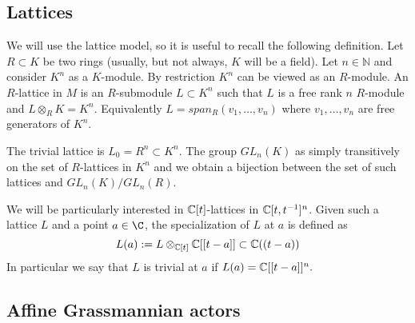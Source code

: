 \documentclass{article}
\begin{document}

\subsection{Lattices}
We will use the lattice model, so it is useful to recall the following definition.  Let $ R \subset K$ be two rings (usually, but not always, $K $ will be a field).  Let $ n \in \mathbb N$ and consider $ K^n $ as a $K$-module.   By restriction $ K^n$ can be viewed as an $R$-module.  An $R$-lattice in $ M$ is an $R$-submodule $ L \subset K^n$ such that $ L $ is a free rank $ n $ $R$-module and $ L \otimes_R K = K^n $.  Equivalently $ L = span_R(v_1, \dots, v_n)$ where $ v_1, \dots, v_n$ are free generators of $K^n$.  

The trivial lattice is $L_0 = R^n \subset K^n $.  The group $GL_n(K) $ as simply transitively on the set of $ R$-lattices in $K^n$ and we obtain a bijection between the set of such lattices and $ GL_n(K)/GL_n(R)$.

We will be particularly interested in $\mathbb C[t]$-lattices in $ \mathbb C[t,t^{-1}]^n$.  Given such a lattice $ L $ and a point $ a \in \C$, the specialization of $ L $ at $ a $ is defined as
$$
L(a) := L \otimes_{\mathbb C[t]} \mathbb C[[t-a]] \subset \mathbb C((t-a))
$$
In particular we say that $ L $ is trivial at $ a $ if $ L(a) = \mathbb C[[t-a]]^n.$


\subsection{Affine Grassmannian actors}
\end{document}
